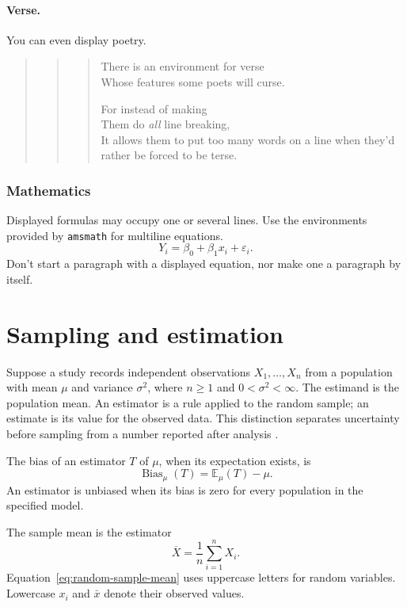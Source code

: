 \paragraph{Verse.}
You can even display poetry.


\begin{quote}
  \begin{quote}
    \begin{verse}
      There is an environment for verse \\
      Whose features some poets will curse.


      For instead of making\\
      Them do {\em all\/} line breaking, \\
      It allows them to put too many words on a line when they'd
      rather be forced to be terse.
    \end{verse}
  \end{quote}
\end{quote}


\subsubsection{Mathematics}
Displayed formulas may occupy one or several lines. Use the environments
provided by \texttt{amsmath} for multiline equations.
\[
  Y_i = \beta_0+\beta_1 x_i+\varepsilon_i.
\]
Don't start a paragraph with a displayed equation, nor make one a paragraph by
itself.


\section{Sampling and estimation}
Suppose a study records independent observations $X_1,\ldots,X_n$ from a
population with mean $\mu$ and variance $\sigma^2$, where $n\geq 1$ and
$0<\sigma^2<\infty$. The estimand is the population mean. An estimator is a
rule applied to the random sample; an estimate is its value for the observed
data. This distinction separates uncertainty before sampling from a number
reported after analysis \citep{wasserman2004all}.


\begin{definition}[Bias]
  The bias of an estimator $T$ of $\mu$, when its expectation exists, is
  \[
    \operatorname{Bias}_{\mu}(T) = \mathbb{E}_{\mu}(T)-\mu.
  \]
  An estimator is unbiased when its bias is zero for every population in the
  specified model.
\end{definition}
The sample mean is the estimator
\begin{equation}
  \label{eq:random-sample-mean}
  \overline{X} = \frac{1}{n}\sum_{i=1}^{n}X_i.
\end{equation}
Equation~\eqref{eq:random-sample-mean} uses uppercase letters for random
variables. Lowercase $x_i$ and $\bar{x}$ denote their observed values.


